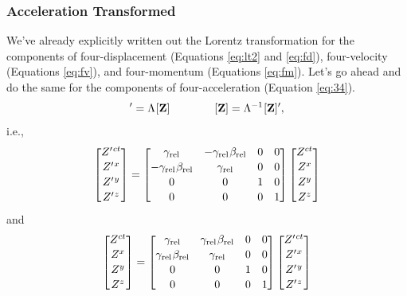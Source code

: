 \documentclass[12pt]{article}
\renewcommand{\vv}[1]{\mathbf{#1}}
\begin{document}
\subsubsection{Acceleration Transformed}

We've already explicitly written out the Lorentz transformation for the components of four-displacement (Equations \ref{eq:lt2} and \ref{eq:fd}), four-velocity (Equations \ref{eq:fv}), and four-momentum (Equations \ref{eq:fm}). Let's go ahead and do the same for the components of four-acceleration (Equation \ref{eq:34}).
\begin{equation*}
[\vv Z]^\prime = \Lambda \mkern1mu [\vv Z] \qquad \qquad [\vv Z] = \Lambda^{-1} \mkern1mu [\vv Z]^\prime ,
\end{equation*}
i.e.,
\begin{equation*}
\begin{bmatrix}
Z^{\prime \mkern1.5mu ct} \\[.15 em]
Z^{\prime \mkern1.5mu x} \\[.15 em]
Z^{\prime \mkern1.5mu y} \\[.15 em]
Z^{\prime \mkern1.5mu z}
\end{bmatrix}
=
\begin{bmatrix}
\gamma_{\textrm{rel}} & -\gamma_{\textrm{rel}} \mkern1mu \beta_{\textrm{rel}} & 0 & 0 \\[.15 em]
- \gamma_{\textrm{rel}} \mkern1mu \beta_{\textrm{rel}} & \gamma_{\textrm{rel}} & 0 & 0 \\[.15 em]
0 & 0 & 1 & 0 \\[.15 em]
0 & 0 & 0 & 1
\end{bmatrix}
\begin{bmatrix}
Z^{ct} \\[.15 em]
Z^{x} \\[.15 em]
Z^{y} \\[.15 em]
Z^{z}
\end{bmatrix}
\end{equation*}
and
\begin{equation*}
\begin{bmatrix}
Z^{ct} \\[.15 em]
Z^{x} \\[.15 em]
Z^{y} \\[.15 em]
Z^{z}
\end{bmatrix}
=
\begin{bmatrix}
\gamma_{\textrm{rel}} & \gamma_{\textrm{rel}} \mkern1mu \beta_{\textrm{rel}} & 0 & 0 \\[.15 em]
\gamma_{\textrm{rel}} \mkern1mu \beta_{\textrm{rel}} & \gamma_{\textrm{rel}} & 0 & 0 \\[.15 em]
0 & 0 & 1 & 0 \\[.15 em]
0 & 0 & 0 & 1
\end{bmatrix}
\begin{bmatrix}
Z^{\prime \mkern1.5mu ct} \\[.15 em]
Z^{\prime \mkern1.5mu x} \\[.15 em]
Z^{\prime \mkern1.5mu y} \\[.15 em]
Z^{\prime \mkern1.5mu z}
\end{bmatrix}
\end{equation*}
\end{document}
